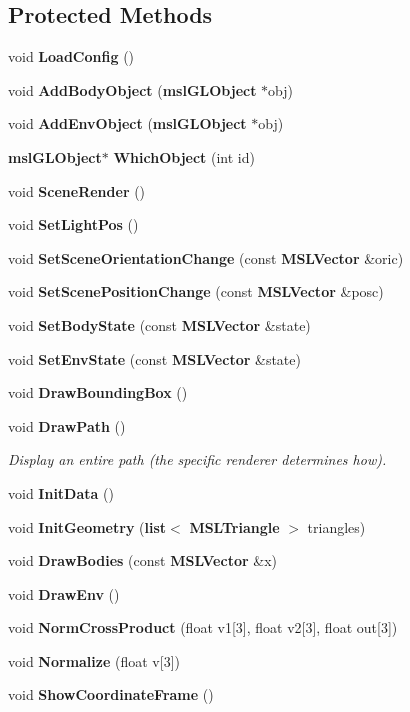 \subsection*{Protected Methods}
\begin{CompactItemize}
\item 
void {\bf Load\-Config} ()
\item 
void {\bf Add\-Body\-Object} ({\bf msl\-GLObject} $\ast$obj)
\item 
void {\bf Add\-Env\-Object} ({\bf msl\-GLObject} $\ast$obj)
\item 
{\bf msl\-GLObject}$\ast$ {\bf Which\-Object} (int id)
\item 
void {\bf Scene\-Render} ()
\item 
void {\bf Set\-Light\-Pos} ()
\item 
void {\bf Set\-Scene\-Orientation\-Change} (const {\bf MSLVector} \&oric)
\item 
void {\bf Set\-Scene\-Position\-Change} (const {\bf MSLVector} \&posc)
\item 
void {\bf Set\-Body\-State} (const {\bf MSLVector} \&state)
\item 
void {\bf Set\-Env\-State} (const {\bf MSLVector} \&state)
\item 
void {\bf Draw\-Bounding\-Box} ()
\item 
void {\bf Draw\-Path} ()
\begin{CompactList}\small\item\em Display an entire path (the specific renderer determines how).\item\end{CompactList}\item 
void {\bf Init\-Data} ()
\item 
void {\bf Init\-Geometry} ({\bf list}$<$ {\bf MSLTriangle} $>$ triangles)
\item 
void {\bf Draw\-Bodies} (const {\bf MSLVector} \&x)
\item 
void {\bf Draw\-Env} ()
\item 
void {\bf Norm\-Cross\-Product} (float v1[3], float v2[3], float out[3])
\item 
void {\bf Normalize} (float v[3])
\item 
void {\bf Show\-Coordinate\-Frame} ()
\end{CompactItemize}
